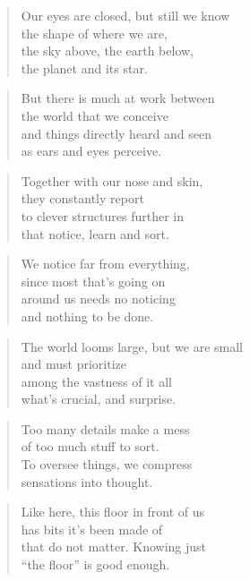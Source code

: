 \documentclass[14pt,a4paper]{article}
\begin{document}
\begin{verse}
Our eyes are closed, but still we know\\
the shape of where we are,\\
the sky above, the earth below,\\
the planet and its star.
\end{verse}

\begin{verse}
But there is much at work between\\
the world that we conceive\\
and things directly heard and seen\\
as ears and eyes perceive.
\end{verse}

\begin{verse}
Together with our nose and skin,\\
they constantly report\\
to clever structures further in\\
that notice, learn and sort.
\end{verse}

\begin{verse}
We notice far from everything,\\
since most that’s going on\\
around us needs no noticing\\
and nothing to be done.
\end{verse}

\begin{verse}
The world looms large, but we are small\\
and must prioritize\\
among the vastness of it all\\
what’s crucial, and surprise.
\end{verse}

\begin{verse}
Too many details make a mess\\
of too much stuff to sort.\\
To oversee things, we compress\\
sensations into thought.
\end{verse}

\begin{verse}
Like here, this floor in front of us\\
has bits it’s been made of\\
that do not matter. Knowing just\\
“the floor” is good enough.
\end{verse}
\end{document}
